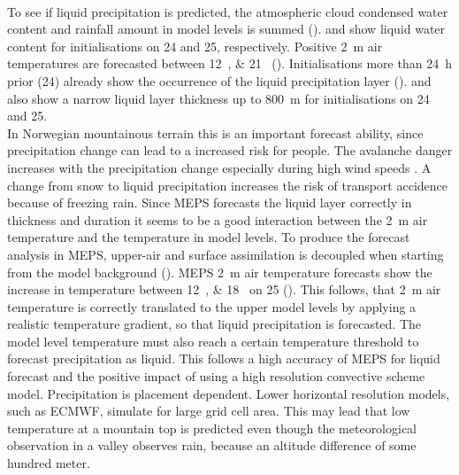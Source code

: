 \\
To see if liquid precipitation is predicted, the atmospheric cloud condensed water content and rainfall amount in model levels is summed ().  and  show liquid water content for initialisations on \SI{24}{\dec} and \SI{25}{\dec}, respectively. Positive \SI{2}{\metre} air temperatures are forecasted between \SIlist{12;21}{\UTC} (). Initialisations more than \SI{24}{\hour} prior (\SI{24}{\dec}) already show the occurrence of the liquid precipitation layer ().  and  also show a narrow liquid layer thickness up to \SI{800}{\metre} for initialisations on \num{24} and \SI{25}{\dec}. 
\\
In Norwegian mountainous terrain this is an important forecast ability, since precipitation change can lead to a increased risk for people. The avalanche danger increases with the precipitation change especially during high wind speeds \citep{hansen_warmer_2014}. A change from snow to liquid precipitation increases the risk of transport accidence because of freezing rain.
Since MEPS forecasts the liquid layer correctly in thickness and duration it seems to be a good interaction between the \SI{2}{\metre} air temperature and the temperature in model levels. To produce the forecast analysis in MEPS, upper-air and surface assimilation is decoupled when starting from the model background (). MEPS \SI{2}{\metre} air temperature forecasts show the increase in temperature between \SIlist{12;18}{\UTC} on \SI{25}{\dec} (). This follows, that \SI{2}{\metre} air temperature is correctly translated to the upper model levels by applying a realistic temperature gradient, so that liquid precipitation is forecasted. 
The model level temperature must also reach a certain temperature threshold to forecast precipitation as liquid. 
This follows a high accuracy of MEPS for liquid forecast and the positive impact of using a high resolution convective scheme model. Precipitation is placement dependent. Lower horizontal resolution models, such as ECMWF, simulate for large grid cell area. This may lead that low temperature at a mountain top is predicted even though the meteorological observation in a valley observes rain, because an altitude difference of some hundred meter. %
\\
\\

